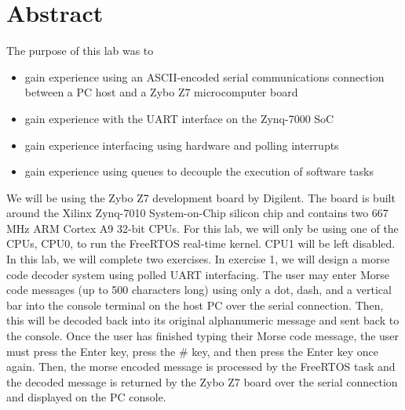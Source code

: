 \documentclass[11pt, letterpaper, titlepage]{article}
\title{\textbf{\Huge{ 
\begin{center}
ECE 315 Lab 2%
\end{center} 
}}}
\author{Lora Ma \\ Benjamin Kong \\ \\ECE 315 Lab Section H41}
\begin{document}
\maketitle

\thispagestyle{empty}
\tableofcontents 
\newpage
{}

\section{Abstract}

The purpose of this lab was to
\begin{itemize}
  \item gain experience using an ASCII-encoded serial communications connection between a PC host and a Zybo Z7 microcomputer board
  \item gain experience with the UART interface on the Zynq-7000 SoC
  \item gain experience interfacing using hardware and polling interrupts
  \item gain experience using queues to decouple the execution of software tasks
\end{itemize}

We will be using the Zybo Z7 development board by Digilent. The board is built
around the Xilinx Zynq-7010 System-on-Chip silicon chip and contains two 667 MHz ARM
Cortex A9 32-bit CPUs. For this lab, we will only be using one of the CPUs, CPU0, to run the FreeRTOS real-time kernel. CPU1 will be left disabled. \\

In this lab, we will complete two exercises. In exercise 1, we will design a morse code decoder system using polled UART interfacing. The user may enter Morse code messages (up to 500 characters long) using only a dot, dash, and a vertical bar into the console terminal on the host PC over the serial connection. Then, this will be decoded back into its original alphanumeric message and sent back to the console. Once the user has finished typing their Morse code message, the user must press the Enter key, press the \# key, and then press the Enter key once again. Then, the morse encoded message is processed by the FreeRTOS task and the decoded message is returned by the Zybo Z7 board over the serial connection and displayed on the PC console. \\ 
\end{document}
